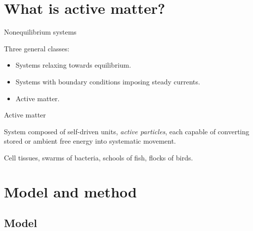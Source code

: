 \documentclass{beamer}
\begin{document}
\section{What is active matter?}

\begin{frame}{Nonequilibrium systems}

Three general classes:
\begin{itemize}[<+->]
  \item Systems relaxing towards equilibrium.
  \item Systems with boundary conditions imposing steady currents.
  \item Active matter.
\end{itemize}


\end{frame}

\begin{frame}{Active matter}

\begin{definition}
System composed of self-driven units, \textit{active particles}, each capable of converting stored or ambient free energy into systematic movement.
\end{definition}
\pause
\begin{example}
Cell tissues, swarms of bacteria, schools of fish, flocks of birds.
\end{example}

\end{frame}

\section{Model and method}

\subsection{Model}
\end{document}
